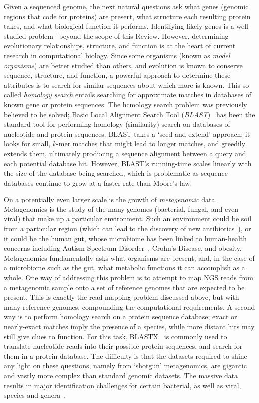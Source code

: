 \documentclass{acm_proc_article-sp}
\begin{document}
Given a sequenced genome, the next natural questions ask what genes (genomic
regions that code for proteins) are present, what structure each resulting
protein takes, and what biological function it performs.
Identifying likely genes is a well-studied problem~\cite{berger2013computational} 
beyond the scope of this Review.
However, determining evolutionary relationships, structure, and function is
at the heart of current research in computational biology.
Since some organisms (known as \emph{model organisms}) are better studied than
others, and evolution is known to conserve sequence, structure, and function,
a powerful approach to determine these attributes is to search for similar
sequences about which more is known. 
This so-called \emph{homology search} entails searching for approximate
matches in databases of known gene or protein sequences.
The homology search problem was previously believed to be solved;
Basic Local Alignment Search Tool (\emph{BLAST})~\cite{berger2013computational} has been
the standard tool for performing homology (similarity) search on databases of nucleotide and
protein sequences.
BLAST takes a `seed-and-extend' approach; it looks for small, $k$-mer matches
that might lead to longer matches, and greedily extends them, ultimately 
producing a sequence alignment between a query and each potential 
database hit.
However, BLAST's running-time scales linearly with the size of the database being
searched, which is problematic as sequence databases continue to grow at a
faster rate than Moore's law.

On a potentially even larger scale is the growth of \emph{metagenomic} data.
Metagenomics is the study of the many genomes (bacterial, fungal, and even 
viral) that make up a particular environment.
Such an environment could be soil from a particular region (which can lead to 
the discovery of new 
antibiotics~\cite{forsberg2012shared}), or it could be 
the human gut, whose microbiome has been linked to human-health concerns 
including Autism Spectrum Disorder~\cite{macfabe2012short}, 
Crohn's Disease, and 
obesity.
Metagenomics fundamentally asks what organisms are present, and, in the case
of a microbiome such as the gut, what metabolic functions it can accomplish as
a whole.
One way of addressing this problem is to attempt to map NGS reads from a metagenomic sample
onto a set of reference genomes that are expected to be present.
This is exactly the read-mapping problem discussed above, but with many 
reference genomes, compounding the computational requirements.
A second way is to perform homology search on a protein sequence database;
exact or nearly-exact matches imply the presence of a species, while more 
distant hits may still give clues to function.
For this task, BLASTX~\cite{altschul1990basic} is commonly
used to translate nucleotide reads into their possible protein sequences, and
search for them in a protein database.
The difficulty is that the datasets required to shine any light on these 
questions, namely from `shotgun' metagenomics, are gigantic and vastly more 
complex than standard genomic datasets.
The massive data results in major identification 
challenges for certain bacterial, as well as viral, species and 
genera~\cite{janda200716s}. 
\end{document}
